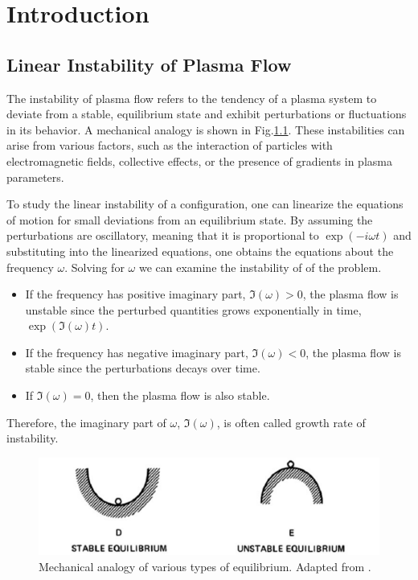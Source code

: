 \chapter{Introduction}
\section{Linear Instability of Plasma Flow}
The instability of plasma flow refers to the tendency of a plasma system to deviate from a stable, equilibrium state and exhibit perturbations or fluctuations in its behavior.\cite{chen_introduction_2016} A mechanical analogy is shown in Fig.\ref{fig:stability-visualization}. These instabilities can arise from various factors, such as the interaction of particles with electromagnetic fields, collective effects, or the presence of gradients in plasma parameters.

To study the linear instability of a configuration, one can linearize the equations of motion for small deviations from an equilibrium state. \cite{chen_introduction_2016} By assuming the perturbations are oscillatory, meaning that it is proportional to $\exp(-i\omega t)$ and substituting into the linearized equations, one obtains the equations about the frequency $\omega$. Solving for $\omega$ we can examine the instability of of the problem.
\begin{itemize}
  \item If the frequency has positive imaginary part, $\Im(\omega)>0$, the plasma flow is unstable since the perturbed quantities grows exponentially in time, $\exp(\Im(\omega)t)$.
  \item If the frequency has negative imaginary part, $\Im(\omega)<0$, the plasma flow is stable since the perturbations decays over time.

  \item If $\Im(\omega) = 0$, then the plasma flow is also stable. 
\end{itemize}

Therefore, the imaginary part of $\omega$, $\Im(\omega)$, is often called growth rate of instability.

\begin{figure}[htbp]
	\centering
	\includegraphics[width=0.7\linewidth]{figures/stability-visualization}
	\caption{Mechanical analogy of various types of equilibrium. Adapted from \cite{chen_introduction_2016}. }
	\label{fig:stability-visualization}
\end{figure}

